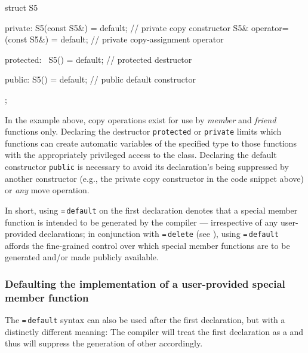 \begin{emcppslisting}
struct S5
{
private:
    S5(const S5&) = default;             // private copy constructor
    S5& operator=(const S5&) = default;  // private copy-assignment operator

protected:
    ~S5() = default;                     // protected destructor

public:
     S5() = default;                     // public default constructor
};
\end{emcppslisting}

\noindent In the example above, copy operations exist for use by \emph{member} and
\emph{friend} functions only. Declaring the destructor
\lstinline!protected! or \lstinline!private! limits which functions can create
automatic variables of the specified type to those functions with the
appropriately privileged access to the class. Declaring the default
constructor \lstinline!public! is necessary to avoid its declaration's
being suppressed by another constructor (e.g., the private copy
constructor in the code snippet above) or \emph{any} move operation.

In short, using \lstinline!=!\,\lstinline!default! on the first declaration
denotes that a special member function is intended to be generated by
the compiler --- irrespective of any user-provided declarations; in
conjunction with {\lstinline!=!\,\lstinline!delete!} (see ),
using
\lstinline!=!\,\lstinline!default! affords the fine-grained control over which
special member functions are to be generated and/or made publicly
available.

\subsubsection[Defaulting the implementation of a user-provided special member function]{Defaulting the implementation of a user-provided special member function}\label{defaulting-the-implementation-of-a-user-provided-special-member-function}

The \lstinline!=!\,\lstinline!default! syntax can also be used after the first
declaration, but with a distinctly different meaning: The compiler will
treat the first declaration as a  and thus will suppress the generation of other
 accordingly.

